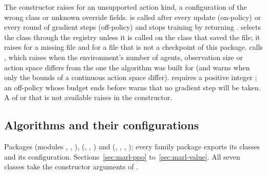 The constructor raises  for an unsupported action kind, a
configuration of the wrong class or unknown override fields.
 is called after every update (on-policy) or
every round of gradient steps (off-policy) and stops training by returning
.  selects the class through the registry
unless it is called on the class that saved the file; it raises
 for a missing file and  for a file
that is not a checkpoint of this package.  calls
, which raises  when the environment's
number of agents, observation size or action space differs from the one the
algorithm was built for (and warns when only the bounds of a continuous
action space differ).  requires a positive integer
; an off-policy  whose budget ends before
 warns that no gradient step will be taken. A
 of  or  that is not available raises
 in the constructor.

\subsection{Algorithms and their configurations}

Packages  (modules ,
, ),  (, ,
) and  (, , ,
); every family package exports its classes and its configuration.
Sections~\ref{sec:marl-ppo} to~\ref{sec:marl-value}. All seven classes take
the constructor arguments of .

